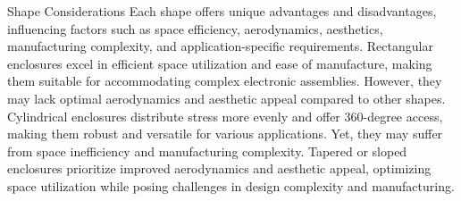 \documentclass[class=report,11pt,crop=false]{standalone}
\begin{document}
Shape Considerations
Each shape offers unique advantages and disadvantages, influencing factors such as space efficiency, aerodynamics, aesthetics, manufacturing complexity, and application-specific requirements.
Rectangular enclosures excel in efficient space utilization and ease of manufacture, making them suitable for accommodating complex electronic assemblies. However, they may lack optimal aerodynamics and aesthetic appeal compared to other shapes.
Cylindrical enclosures distribute stress more evenly and offer 360-degree access, making them robust and versatile for various applications. Yet, they may suffer from space inefficiency and manufacturing complexity.
Tapered or sloped enclosures prioritize improved aerodynamics and aesthetic appeal, optimizing space utilization while posing challenges in design complexity and manufacturing.
\end{document}
